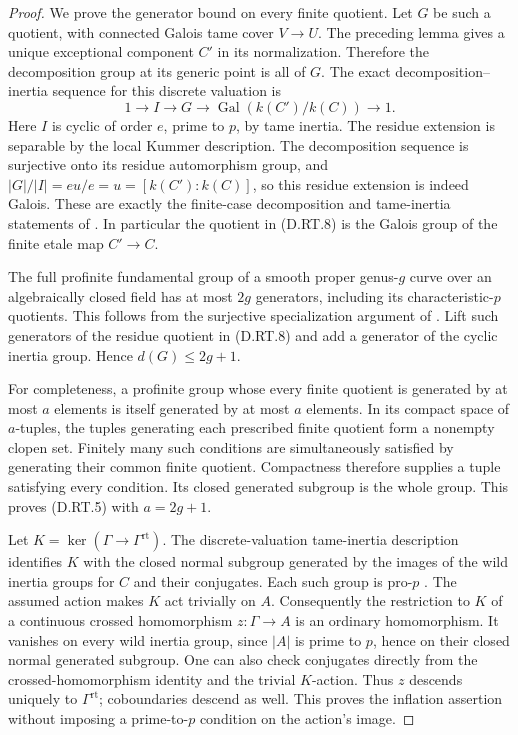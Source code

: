 \begin{proof}
We prove the generator bound on every finite quotient.
Let $G$ be such a quotient, with connected Galois tame cover
$V\to U$. The preceding lemma gives a unique exceptional
component $C'$ in its normalization. Therefore the
decomposition group at its generic point is all of $G$.
The exact decomposition--inertia sequence for this
discrete valuation is
\[
        1\longrightarrow I\longrightarrow G
          \longrightarrow\operatorname{Gal}(k(C')/k(C))
          \longrightarrow1.                           \tag{D.RT.8}
\]
Here $I$ is cyclic of order $e$, prime to $p$, by tame
inertia. The residue extension is separable by the local
Kummer description. The decomposition sequence is
surjective onto its residue automorphism group, and
$|G|/|I|=eu/e=u=[k(C'):k(C)]$, so this residue extension
is indeed Galois. These are exactly the finite-case
decomposition and tame-inertia statements of
\citep[Lemma 58.13.5, Tag 0BUA, complete proof]
{StacksRadialTameGeometryB}. In particular the quotient
in (D.RT.8) is the Galois group of the finite etale map
$C'\to C$.

The full profinite fundamental group of a smooth proper
genus-$g$ curve over an algebraically closed field has at
most $2g$ generators, including its characteristic-$p$
quotients. This follows from the surjective specialization
argument of \citet[Theorem X.2.6 and its complete preceding
argument, original pp.~272--273]{SGA1}. Lift such generators
of the residue quotient in (D.RT.8) and add a generator
of the cyclic inertia group. Hence $d(G)\leq2g+1$.

For completeness, a profinite group whose every finite
quotient is generated by at most $a$ elements is itself
generated by at most $a$ elements. In its compact space
of $a$-tuples, the tuples generating each prescribed
finite quotient form a nonempty clopen set. Finitely
many such conditions are simultaneously satisfied by
generating their common finite quotient. Compactness
therefore supplies a tuple satisfying every condition.
Its closed generated subgroup is the whole group.
This proves (D.RT.5) with $a=2g+1$.

Let $K=\ker(\Gamma\to\Gamma^{\mathrm{rt}})$.
The discrete-valuation tame-inertia description identifies
$K$ with the closed normal subgroup generated by the
images of the wild inertia groups for $C$ and their
conjugates. Each such group is pro-$p$
\citep[Lemma 58.13.5, Tag 0BUA]{StacksRadialTameGeometryB}.
The assumed action makes $K$ act trivially on $A$.
Consequently the restriction to $K$ of a continuous
crossed homomorphism $z:\Gamma\to A$ is an ordinary
homomorphism. It vanishes on every wild inertia group,
since $|A|$ is prime to $p$, hence on their closed normal
generated subgroup. One can also check conjugates
directly from the crossed-homomorphism identity and the
trivial $K$-action. Thus $z$ descends uniquely to
$\Gamma^{\mathrm{rt}}$; coboundaries descend as well.
This proves the inflation assertion without imposing a
prime-to-$p$ condition on the action's image.


\end{proof}
